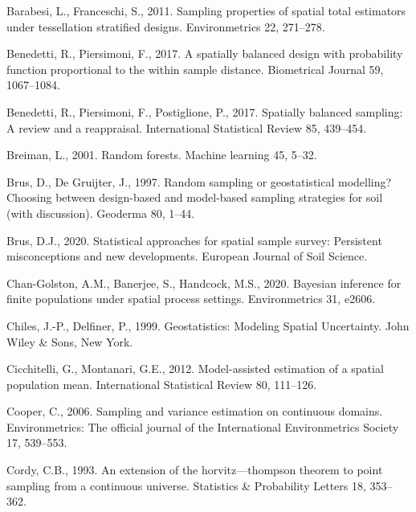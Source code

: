 \documentclass[]{elsarticle} %
\begin{document}
\hypertarget{refs}{}
\leavevmode\hypertarget{ref-barabesi2011sampling}{}%
Barabesi, L., Franceschi, S., 2011. Sampling properties of spatial total
estimators under tessellation stratified designs. Environmetrics 22,
271--278.

\leavevmode\hypertarget{ref-benedetti2017spatially}{}%
Benedetti, R., Piersimoni, F., 2017. A spatially balanced design with
probability function proportional to the within sample distance.
Biometrical Journal 59, 1067--1084.

\leavevmode\hypertarget{ref-benedetti2017spatiallyreview}{}%
Benedetti, R., Piersimoni, F., Postiglione, P., 2017. Spatially balanced
sampling: A review and a reappraisal. International Statistical Review
85, 439--454.

\leavevmode\hypertarget{ref-breiman2001random}{}%
Breiman, L., 2001. Random forests. Machine learning 45, 5--32.

\leavevmode\hypertarget{ref-brus1997random}{}%
Brus, D., De Gruijter, J., 1997. Random sampling or geostatistical
modelling? Choosing between design-based and model-based sampling
strategies for soil (with discussion). Geoderma 80, 1--44.

\leavevmode\hypertarget{ref-brus2020statistical}{}%
Brus, D.J., 2020. Statistical approaches for spatial sample survey:
Persistent misconceptions and new developments. European Journal of Soil
Science.

\leavevmode\hypertarget{ref-chan2020bayesian}{}%
Chan-Golston, A.M., Banerjee, S., Handcock, M.S., 2020. Bayesian
inference for finite populations under spatial process settings.
Environmetrics 31, e2606.

\leavevmode\hypertarget{ref-chiles1999geostatistics}{}%
Chiles, J.-P., Delfiner, P., 1999. Geostatistics: Modeling Spatial
Uncertainty. John Wiley \& Sons, New York.

\leavevmode\hypertarget{ref-cicchitelli2012model}{}%
Cicchitelli, G., Montanari, G.E., 2012. Model-assisted estimation of a
spatial population mean. International Statistical Review 80, 111--126.

\leavevmode\hypertarget{ref-cooper2006sampling}{}%
Cooper, C., 2006. Sampling and variance estimation on continuous
domains. Environmetrics: The official journal of the International
Environmetrics Society 17, 539--553.

\leavevmode\hypertarget{ref-cordy1993extension}{}%
Cordy, C.B., 1993. An extension of the horvitz---thompson theorem to
point sampling from a continuous universe. Statistics \& Probability
Letters 18, 353--362.
\end{document}

